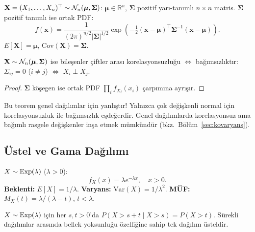 \begin{tanim}
\label{def:cok_normal}
$\mathbf{X} = (X_1, \ldots, X_n)^\top \sim \mathcal{N}_n(\boldsymbol{\mu}, \boldsymbol{\Sigma})$:
$\boldsymbol{\mu} \in \mathbb{R}^n$, $\boldsymbol{\Sigma}$ pozitif yarı-tanımlı $n\times n$ matris.
$\boldsymbol{\Sigma}$ pozitif tanımlı ise ortak PDF:
\[
  f(\mathbf{x}) = \frac{1}{(2\pi)^{n/2}|\boldsymbol{\Sigma}|^{1/2}}
  \exp\!\left(-\tfrac{1}{2}(\mathbf{x}-\boldsymbol{\mu})^\top \boldsymbol{\Sigma}^{-1}(\mathbf{x}-\boldsymbol{\mu})\right).
\]
$E[\mathbf{X}] = \boldsymbol{\mu}$, $\mathrm{Cov}(\mathbf{X}) = \boldsymbol{\Sigma}$.
\end{tanim}

\begin{teorem}
\label{thm:cok_normal_bagimsiz}
$\mathbf{X} \sim \mathcal{N}_n(\boldsymbol{\mu}, \boldsymbol{\Sigma})$ ise
bileşenler çiftler arası korelasyonsuzluğu $\Leftrightarrow$ bağımsızlıktır:
$\Sigma_{ij} = 0$ ($i \neq j$) $\Leftrightarrow$ $X_i \perp X_j$.
\end{teorem}

\begin{proof}
$\boldsymbol{\Sigma}$ köşegen ise ortak PDF $\prod_i f_{X_i}(x_i)$ çarpımına ayrışır.
\end{proof}

\begin{hataanalizi}
Bu teorem genel dağılımlar için yanlıştır! Yalnızca çok değişkenli normal için
korelasyonsuzluk ile bağımsızlık eşdeğerdir. Genel dağılımlarda korelasyonsuz
ama bağımlı rasgele değişkenler inşa etmek mümkündür (bkz.\ Bölüm~\ref{sec:kovaryans}).
\end{hataanalizi}

\subsection{Üstel ve Gama Dağılımı}
\label{subsec:gama}

\begin{tanim}
\label{def:exp}
$X \sim \operatorname{Exp}(\lambda)$ ($\lambda > 0$):
\[
  f_X(x) = \lambda e^{-\lambda x}, \quad x > 0.
\]
\textbf{Beklenti:} $E[X] = 1/\lambda$. \quad
\textbf{Varyans:} $\mathrm{Var}(X) = 1/\lambda^2$. \quad
\textbf{MÜF:} $M_X(t) = \lambda/(\lambda - t)$, $t < \lambda$.
\end{tanim}

\begin{onerme}
$X \sim \operatorname{Exp}(\lambda)$ için her $s, t > 0$'da $P(X > s+t \mid X > s) = P(X > t)$.
Sürekli dağılımlar arasında bellek yoksunluğu özelliğine sahip tek dağılım üsteldir.
\end{onerme}


